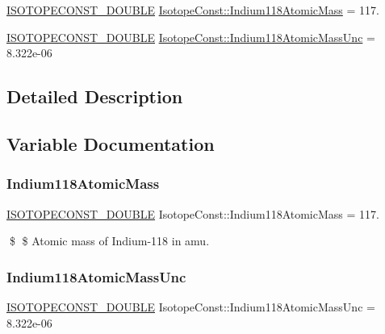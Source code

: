 \begin{DoxyCompactItemize}
\item 
\mbox{\hyperlink{group___isotope_const-_macros_ga8f45a7272ce02c0b4c65c44636ed719a}{I\+S\+O\+T\+O\+P\+E\+C\+O\+N\+S\+T\+\_\+\+D\+O\+U\+B\+LE}} \mbox{\hyperlink{group___isotope_const-_indium-_in118_ga319565d84abd78180f7730b758d16b2b}{Isotope\+Const\+::\+Indium118\+Atomic\+Mass}} = 117.
\item 
\mbox{\hyperlink{group___isotope_const-_macros_ga8f45a7272ce02c0b4c65c44636ed719a}{I\+S\+O\+T\+O\+P\+E\+C\+O\+N\+S\+T\+\_\+\+D\+O\+U\+B\+LE}} \mbox{\hyperlink{group___isotope_const-_indium-_in118_ga35e7818e1a690fda9dd129edded6a6c0}{Isotope\+Const\+::\+Indium118\+Atomic\+Mass\+Unc}} = 8.\+322e-\/06
\end{DoxyCompactItemize}


\subsection{Detailed Description}


\subsection{Variable Documentation}
\mbox{\label{group___isotope_const-_indium-_in118_ga319565d84abd78180f7730b758d16b2b}} 
\subsubsection{\texorpdfstring{Indium118\+Atomic\+Mass}{Indium118AtomicMass}}
{\footnotesize\ttfamily \mbox{\hyperlink{group___isotope_const-_macros_ga8f45a7272ce02c0b4c65c44636ed719a}{I\+S\+O\+T\+O\+P\+E\+C\+O\+N\+S\+T\+\_\+\+D\+O\+U\+B\+LE}} Isotope\+Const\+::\+Indium118\+Atomic\+Mass = 117.}

\$ \$ Atomic mass of Indium-\/118 in amu. \mbox{\label{group___isotope_const-_indium-_in118_ga35e7818e1a690fda9dd129edded6a6c0}} 
\subsubsection{\texorpdfstring{Indium118\+Atomic\+Mass\+Unc}{Indium118AtomicMassUnc}}
{\footnotesize\ttfamily \mbox{\hyperlink{group___isotope_const-_macros_ga8f45a7272ce02c0b4c65c44636ed719a}{I\+S\+O\+T\+O\+P\+E\+C\+O\+N\+S\+T\+\_\+\+D\+O\+U\+B\+LE}} Isotope\+Const\+::\+Indium118\+Atomic\+Mass\+Unc = 8.\+322e-\/06}

